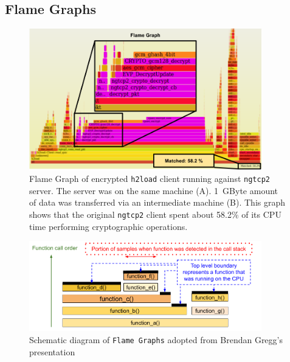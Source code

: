 \documentclass[12pt,a4paper]{report}
\begin{document}
\subsection{Flame Graphs}

    \begin{figure}[!htb]
    \centering
    \includegraphics[width=0.9\textwidth]{figs/zoomed_encrypted_flame_graph_1GByte_h2load.png}
    \caption[Flame Graph of \texttt{h2load} client running against \texttt{ngtcp2} server]{Flame Graph of encrypted \texttt{h2load} client running against \texttt{ngtcp2} server.
    The server was on the same machine (A). 1~GByte amount of data was transferred via an intermediate machine (B). This graph shows that the original \texttt{ngtcp2} client spent about 58.2\% of its CPU time performing cryptographic operations.} 
    \label{fig:perf_results_of_h2load}
    \end{figure}
    
    
    \begin{figure}[!htb]
    \centering
    \includegraphics[width=0.9\textwidth]{figs/Flame_Graphs_explanation.png}
    \caption[Schematic diagram of \texttt{Flame Graphs}]{Schematic diagram of \texttt{Flame Graphs} adopted from Brendan Gregg's presentation~\cite{USENIX_ATC2017_flamegraphs}}
    \label{fig:Flame_Graphs_explanation}
    \end{figure}
    
\end{document}
